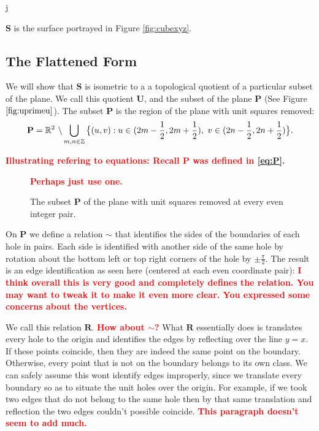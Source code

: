 j\documentclass[]{article}
\newcommand{\compat}[1]{\textbf{\textcolor{red}{#1}}}
\begin{document}
\noindent $\mathbf{S}$ is the surface portrayed in Figure \ref{fig:cubexyz}. 

\subsection{The Flattened Form}
We will show that $\mathbf S$ is isometric to a a topological quotient of a particular subset of the plane. We call this quotient $\mathbf{U}$, and the subset of the plane $\mathbf P$ (See Figure $\ref{fig:uprimeu}$).
The subset $\mathbf P$ is the region of the plane with unit squares removed:
\begin{equation}
\label{eq:P}
\mathbf{P} = \mathbb{R}^{2}\text{ }\backslash\bigcup_{m,n \in {\mathbb Z}} \big{\{}(u,v):u\in(2m-\frac{1}{2},2m+\frac{1}{2}),\text{ } v\in(2n-\frac{1}{2},2n+\frac{1}{2})\big{\}}.
\end{equation}

\compat{Illustrating refering to equations: Recall $\mathbf{P}$ was defined in \eqref{eq:P}.}


\begin{figure}[H]
\begin{center}

\end{center}
\caption{The subset $\mathbf P$ of the plane with unit squares removed at every even integer pair.} \compat{Perhaps just use one.}
\label{fig:uprimeu}
\end{figure}

\noindent On $\mathbf P$ we define a relation $\sim$ that identifies the sides of the boundaries of each hole in pairs. Each side is identified with another side of the same hole by rotation about the bottom left or top right corners of the hole by $\pm\frac{\pi}{2}$. The result is an edge identification as seen here (centered at each even coordinate pair): \compat{I think overall this is very good and completely defines the relation. You may want to tweak it to make it even more clear. You expressed some concerns about the vertices.}

\begin{figure}[H]\centering

\end{figure}
\noindent We call this relation $\mathbf{R}$. \compat{How about $\sim$?} What $\mathbf{R}$ essentially does is translates every hole to the origin and identifies the edges by reflecting over the line $y=x$. If these points coincide, then they are indeed the same point on the boundary. Otherwise, every point that is not on the boundary belongs to its own class. We can safely assume this wont identify edges improperly, since we translate every boundary so as to situate the unit holes over the origin. For example, if we took two edges that do not belong to the same hole then by that same translation and reflection the two edges couldn't possible coincide.  \compat{This paragraph doesn't seem to add much.}
\end{document}
